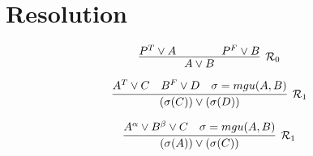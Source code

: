 \section{Resolution}

\noindent
\begin{minipage}{\linewidth}
    \[
        \infer[\mathcal{R}_0]
        {A \lor B}
        {P^T \lor A \qquad \qquad P^F \lor B}
    \]
\end{minipage}

\begin{multicols}{2}
    \noindent
    \begin{minipage}{\linewidth}
        \[
            \infer[\mathcal{R}_1]
            {(\sigma(C)) \lor (\sigma(D))}
            {A^T \lor C \quad B^F \lor D \quad \sigma = mgu(A,B)}
        \]
    \end{minipage}

    \noindent
    \begin{minipage}{\linewidth}
        \[
            \infer[\mathcal{R}_1]
            {(\sigma(A)) \lor (\sigma(C))}
            {A^{\alpha} \lor B^{\beta} \lor C \quad \sigma = mgu(A,B)}
        \]
    \end{minipage}
\end{multicols}
